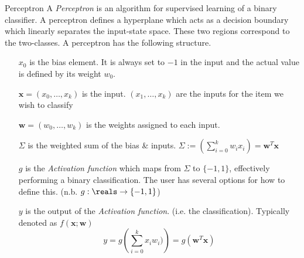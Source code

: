 \documentclass[11pt,a4paper]{article}
\begin{document}
\begin{definition}{Perceptron}
  A \textit{Perceptron} is an algorithm for supervised learning of a binary classifier. A perceptron defines a hyperplane which acts as a decision boundary which linearly separates the input-state space. These two regions correspond to the two-classes. A perceptron has the following structure.

  \begin{center}\end{center}
  \begin{itemize}
    \item[$x_0$] is the bias element. It is always set to $-1$ in the input and the actual value is defined by its weight $w_0$.
    \item[$\pmb{x}=(x_0,\dots,x_k)$] is the input. $(x_1,\dots,x_k)$ are the inputs for the item we wish to classify
    \item[$\pmb{w}=(w_0,\dots,w_k)$] is the weights assigned to each input.
    \item[$\Sigma$] is the weighted sum of the bias \& inputs. $\Sigma:=(\sum_{i=0}^kw_ix_i)=\pmb{w}^T\pmb{x}$
    \item[$g$] is the \textit{Activation function} which maps from $\Sigma$ to $\{-1,1\}$, effectively performing a binary classification. The user has several options for how to define this. (n.b. $g:\reals\to\{-1,1\}$)
    \item[$y$] is the output of the \textit{Activation function}. (i.e. the classification). Typically denoted as $f(\pmb{x};\pmb{w})$ \[ y=g\left(\sum_{i=0}^kx_iw_i)\right)=g(\pmb{w}^T\pmb{x})\]
  \end{itemize}
\end{definition}
\end{document}
